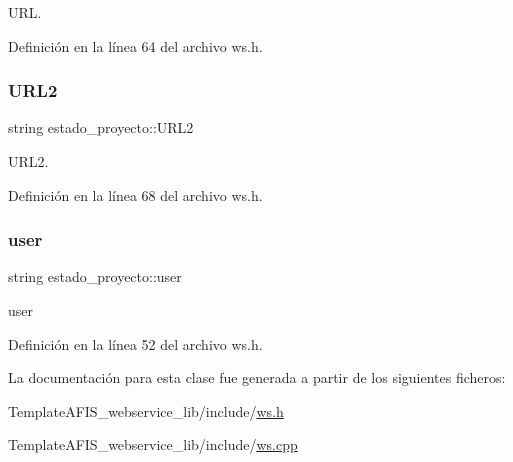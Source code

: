 U\+RL. 



Definición en la línea 64 del archivo ws.\+h.

\hypertarget{classestado__proyecto_af4cd30e97fc087097e738d2ef1d958c9}{}\label{classestado__proyecto_af4cd30e97fc087097e738d2ef1d958c9} 
\subsubsection{\texorpdfstring{U\+R\+L2}{URL2}}
{\footnotesize\ttfamily string estado\+\_\+proyecto\+::\+U\+R\+L2}



U\+R\+L2. 



Definición en la línea 68 del archivo ws.\+h.

\hypertarget{classestado__proyecto_a44126a25c5181e9f06b0c831aa4cc2ce}{}\label{classestado__proyecto_a44126a25c5181e9f06b0c831aa4cc2ce} 
\subsubsection{\texorpdfstring{user}{user}}
{\footnotesize\ttfamily string estado\+\_\+proyecto\+::user}



user 



Definición en la línea 52 del archivo ws.\+h.



La documentación para esta clase fue generada a partir de los siguientes ficheros\+:\begin{DoxyCompactItemize}
\item 
Template\+A\+F\+I\+S\+\_\+webservice\+\_\+lib/include/\hyperlink{ws_8h}{ws.\+h}\item 
Template\+A\+F\+I\+S\+\_\+webservice\+\_\+lib/include/\hyperlink{ws_8cpp}{ws.\+cpp}\end{DoxyCompactItemize}
